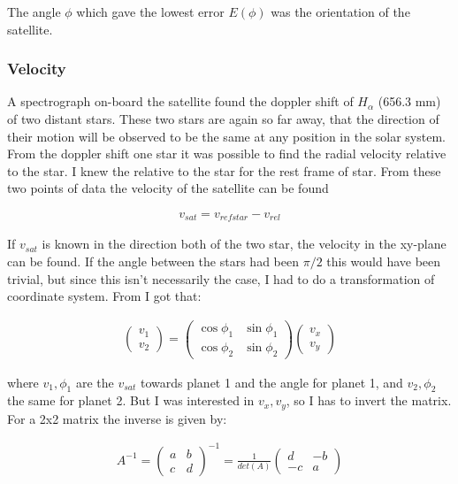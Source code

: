 \documentclass[a4paper, 10pt]{article}
\begin{document}
The angle $\phi$ which gave the lowest error $E(\phi)$ was the orientation of the satellite.

\subsubsection{Velocity}
A spectrograph on-board the satellite found the doppler shift of $H_{\alpha}$ (656.3 mm) of two distant stars. These two stars are again so far away, that the direction of their motion will be observed to be the same at any position in the solar system. From the doppler shift one star it was possible to find the radial velocity relative to the star. I knew the  relative to the star for the rest frame of star. From these two points of data the velocity of the satellite can be found

\begin{align}
v_{sat} = v_{refstar} - v_{rel}
\end{align}

If $v_{sat}$ is known in the direction both of the two star,  the velocity in the xy-plane can be found. If the angle between the stars had been $\pi/2$ this would have been trivial, but since this isn't necessarily the case, I had to do a transformation of coordinate system. From \cite{part4} I got that:

\begin{align}
\begin{pmatrix}
v_1\\
v_2
\end{pmatrix}
=
\begin{pmatrix}
\cos \phi_1 & \sin \phi_1 \\
\cos \phi_2 & \sin \phi_2 
\end{pmatrix}
\begin{pmatrix}
v_x\\
v_y
\end{pmatrix}
\end{align}  

where $v_1,\phi_1$ are the $v_{sat}$ towards planet 1 and the angle for planet 1, and $v_2,\phi_2$ the same for planet 2. But I was interested in $v_x,
v_y$, so I has to invert the matrix. For a 2x2 matrix the inverse is given by:

\begin{align}
A^{-1} = 
\begin{pmatrix}
a & b \\
c & d 
\end{pmatrix}^{-1}
=
\frac{1}{det(A)} 
\begin{pmatrix}
d & -b \\
-c & a 
\end{pmatrix}
\end{align}
\end{document}
